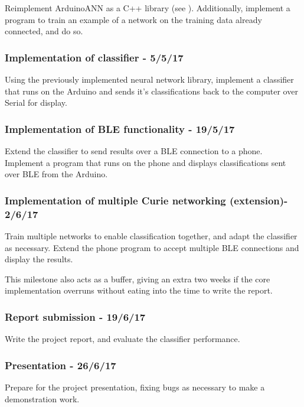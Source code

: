 \documentclass[a4paper]{article}
\begin{document}
Reimplement ArduinoANN as a C++ library (see ). Additionally, implement a program to train an example of a network on the training data already connected, and do so.

\subsubsection{Implementation of classifier - 5/5/17}

Using the previously implemented neural network library, implement a classifier that runs on the Arduino and sends it's classifications back to the computer over Serial for display.

\subsubsection{Implementation of BLE functionality - 19/5/17}

Extend the classifier to send results over a BLE connection to a phone. Implement a program that runs on the phone and displays classifications sent over BLE from the Arduino.

\subsubsection{Implementation of multiple Curie networking (extension)- 2/6/17}

Train multiple networks to enable classification together, and adapt the classifier as necessary.
Extend the phone program to accept multiple BLE connections and display the results.

This milestone also acts as a buffer, giving an extra two weeks if the core implementation overruns without eating into the time to write the report.

\subsubsection{Report submission - 19/6/17}

Write the project report, and evaluate the classifier performance. 

\subsubsection{Presentation - 26/6/17}

Prepare for the project presentation, fixing bugs as necessary to make a demonstration work. 
\end{document}
